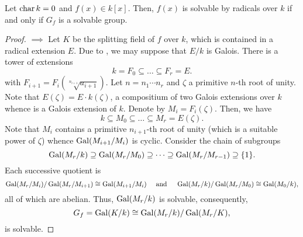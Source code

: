 \begin{theorem}[Galois]
    Let $\operatorname{char} k = 0$ and $f(x)\in k[x]$. Then, $f(x)$ is solvable by radicals over $k$ if and only if $G_f$ is a solvable group.
\end{theorem}
\begin{proof}
    $\implies$ Let $K$ be the splitting field of $f$ over $k$, which is contained in a radical extension $E$. Due to , we may suppose that $E/k$ is Galois. There is a tower of extensions 
    \begin{equation*}
        k = F_0\subseteq\dots\subseteq F_r = E.
    \end{equation*}
    with $F_{i + 1} = F_i\left(\sqrt[n_{i + 1}]{a_{i + 1}}\right)$. Let $n = n_1\cdots n_{r}$ and $\zeta$ a primitive $n$-th root of unity. Note that $E(\zeta) = E\cdot k(\zeta)$, a compositium of two Galois extensions over $k$ whence is a Galois extension of $k$. Denote by $M_i = F_i(\zeta)$. Then, we have 
    \begin{equation*}
        k \subseteq M_0\subseteq\dots\subseteq M_r = E(\zeta).
    \end{equation*}
    Note that $M_i$ contains a primitive $n_{i + 1}$-th root of unity (which is a suitable power of $\zeta$) whence $\operatorname{Gal}(M_{i + 1}/M_i)$ is cyclic. Consider the chain of subgroups 
    \begin{equation*}
        \operatorname{Gal}(M_r/k)\supseteq\operatorname{Gal}(M_r/M_0)\supseteq\dots\supseteq\operatorname{Gal}(M_r/M_{r - 1})\supseteq\{1\}.
    \end{equation*}
    Each successive quotient is 
    \begin{equation*}
        \operatorname{Gal}(M_r/M_i)/\operatorname{Gal}(M_r/M_{i + 1})\cong\operatorname{Gal}(M_{i + 1}/M_i)\quad\text{ and }\quad\operatorname{Gal}(M_r/k)/\operatorname{Gal}(M_r/M_0)\cong\operatorname{Gal}(M_0/k),
    \end{equation*}
    all of which are abelian. Thus, $\operatorname{Gal}(M_r/k)$ is solvable, consequently, 
    \begin{equation*}
        G_f = \operatorname{Gal}(K/k)\cong\operatorname{Gal}(M_r/k)/\operatorname{Gal}(M_r/K),
    \end{equation*}
    is solvable.


\end{proof}
